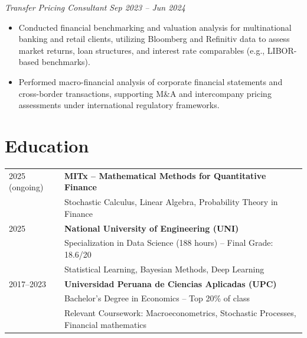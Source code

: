 \documentclass[9pt]{article}
\begin{document}
    \vspace{-2pt}
    \textit{Transfer Pricing Consultant} \hfill \textit{Sep 2023 -- Jun 2024}
    \vspace{-2pt}
    \begin{itemize}[leftmargin=1em, itemsep=0.8pt, topsep=1pt, parsep=0pt, partopsep=0pt]
    \item Conducted financial benchmarking and valuation analysis for multinational banking and retail clients, utilizing Bloomberg and Refinitiv data to assess market returns, loan structures, and interest rate comparables (e.g., LIBOR-based benchmarks).
    \item Performed macro-financial analysis of corporate financial statements and cross-border transactions, supporting M\&A and intercompany pricing assessments under international regulatory frameworks.
    \end{itemize}

    \section{Education}
    \begin{tabularx}{\linewidth}{@{}l X@{}}
    
    2025 (ongoing) & \textbf{MITx – Mathematical Methods for Quantitative Finance} \\
                   & Stochastic Calculus, Linear Algebra, Probability Theory in Finance \\[6pt]
    
    2025 & \textbf{National University of Engineering (UNI)} \\
         & Specialization in Data Science (188 hours) -- Final Grade: 18.6/20 \\
         & Statistical Learning, Bayesian Methods, Deep Learning \\[6pt]
    

    2017--2023 & \textbf{Universidad Peruana de Ciencias Aplicadas (UPC)} \\
               & Bachelor’s Degree in Economics -- Top 20\% of class \\
               & Relevant Coursework: Macroeconometrics, Stochastic Processes, Financial mathematics \\
    
    \end{tabularx}
\end{document}
